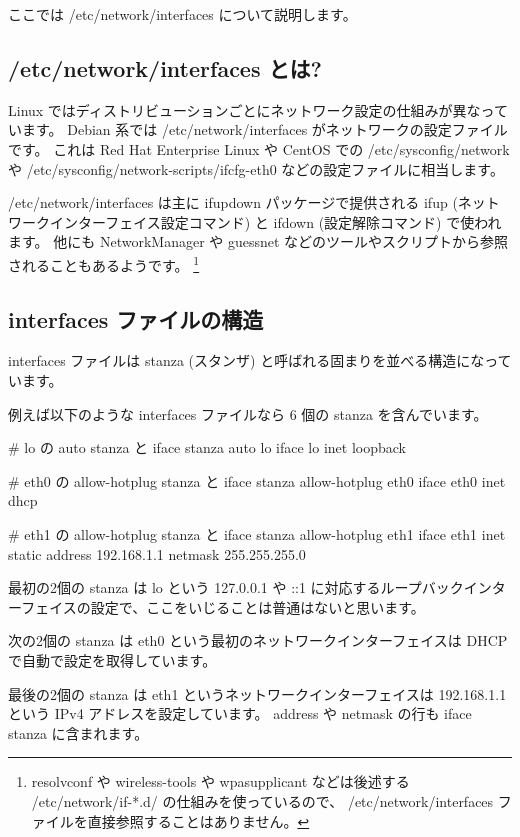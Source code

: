 \documentclass[mingoth,a4paper,twoside]{jsarticle}
\begin{document}
ここでは /etc/network/interfaces について説明します。

\subsection{/etc/network/interfaces とは?}

Linux ではディストリビューションごとにネットワーク設定の仕組みが異なっています。
Debian 系では /etc/network/interfaces がネットワークの設定ファイルです。
これは Red Hat Enterprise Linux や CentOS での /etc/sysconfig/network や /etc/sysconfig/network-scripts/ifcfg-eth0 などの設定ファイルに相当します。

/etc/network/interfaces は主に ifupdown パッケージで提供される ifup (ネットワークインターフェイス設定コマンド) と ifdown (設定解除コマンド) で使われます。
他にも NetworkManager や guessnet などのツールやスクリプトから参照されることもあるようです。
\footnote{resolvconf や wireless-tools や wpasupplicant などは後述する /etc/network/if-*.d/ の仕組みを使っているので、 /etc/network/interfaces ファイルを直接参照することはありません。}

\subsection{interfaces ファイルの構造}

interfaces ファイルは stanza (スタンザ) と呼ばれる固まりを並べる構造になっています。

例えば以下のような interfaces ファイルなら 6 個の stanza を含んでいます。

\begin{commandline}
# lo の auto stanza と iface stanza
auto lo
iface lo inet loopback

# eth0 の allow-hotplug stanza と iface stanza
allow-hotplug eth0
iface eth0 inet dhcp

# eth1 の allow-hotplug stanza と iface stanza
allow-hotplug eth1
iface eth1 inet static
    address 192.168.1.1
    netmask 255.255.255.0
\end{commandline}

最初の2個の stanza は lo という 127.0.0.1 や ::1 に対応するループバックインターフェイスの設定で、ここをいじることは普通はないと思います。

次の2個の stanza は eth0 という最初のネットワークインターフェイスは DHCP で自動で設定を取得しています。

最後の2個の stanza は eth1 というネットワークインターフェイスは 192.168.1.1 という IPv4 アドレスを設定しています。
address や netmask の行も iface stanza に含まれます。
\end{document}
